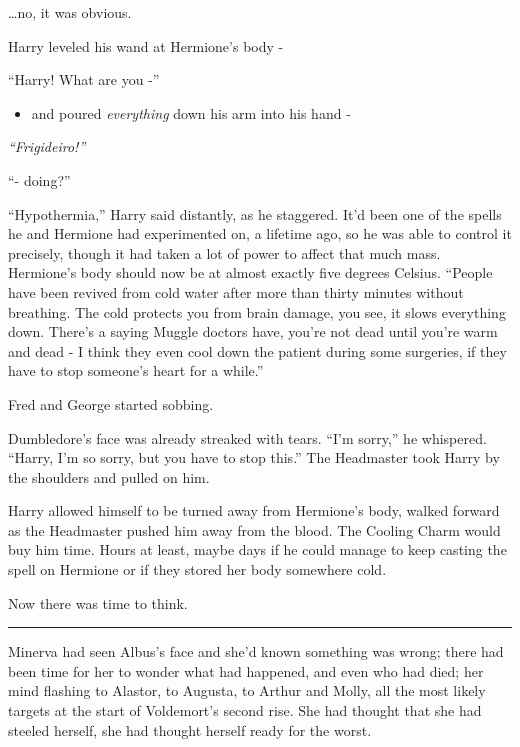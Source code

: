 \ldots{}no, it was obvious.

Harry leveled his wand at Hermione's body -

``Harry! What are you -''

\begin{itemize}
\itemsep1pt\parskip0pt
\item
  and poured \emph{everything} down his arm into his hand -
\end{itemize}

\emph{``Frigideiro!''}

``- doing?''

``Hypothermia,'' Harry said distantly, as he staggered. It'd been one of
the spells he and Hermione had experimented on, a lifetime ago, so he
was able to control it precisely, though it had taken a lot of power to
affect that much mass. Hermione's body should now be at almost exactly
five degrees Celsius. ``People have been revived from cold water after
more than thirty minutes without breathing. The cold protects you from
brain damage, you see, it slows everything down. There's a saying Muggle
doctors have, you're not dead until you're warm and dead - I think they
even cool down the patient during some surgeries, if they have to stop
someone's heart for a while.''

Fred and George started sobbing.

Dumbledore's face was already streaked with tears. ``I'm sorry,'' he
whispered. ``Harry, I'm so sorry, but you have to stop this.'' The
Headmaster took Harry by the shoulders and pulled on him.

Harry allowed himself to be turned away from Hermione's body, walked
forward as the Headmaster pushed him away from the blood. The Cooling
Charm would buy him time. Hours at least, maybe days if he could manage
to keep casting the spell on Hermione or if they stored her body
somewhere cold.

Now there was time to think.

\begin{center}\rule{3in}{0.4pt}\end{center}

Minerva had seen Albus's face and she'd known something was wrong; there
had been time for her to wonder what had happened, and even who had
died; her mind flashing to Alastor, to Augusta, to Arthur and Molly, all
the most likely targets at the start of Voldemort's second rise. She had
thought that she had steeled herself, she had thought herself ready for
the worst.

